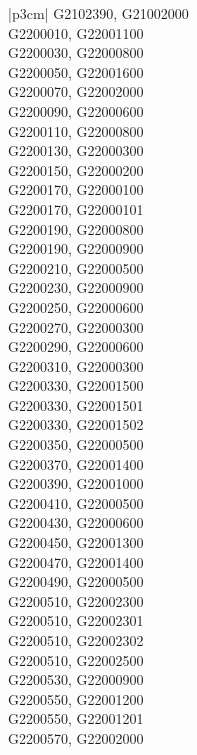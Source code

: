 \begin{customLongTable}{ |p{3cm}| }
G2102390, G21002000 \\ \hline
G2200010, G22001100 \\ \hline
G2200030, G22000800 \\ \hline
G2200050, G22001600 \\ \hline
G2200070, G22002000 \\ \hline
G2200090, G22000600 \\ \hline
G2200110, G22000800 \\ \hline
G2200130, G22000300 \\ \hline
G2200150, G22000200 \\ \hline
G2200170, G22000100 \\ \hline
G2200170, G22000101 \\ \hline
G2200190, G22000800 \\ \hline
G2200190, G22000900 \\ \hline
G2200210, G22000500 \\ \hline
G2200230, G22000900 \\ \hline
G2200250, G22000600 \\ \hline
G2200270, G22000300 \\ \hline
G2200290, G22000600 \\ \hline
G2200310, G22000300 \\ \hline
G2200330, G22001500 \\ \hline
G2200330, G22001501 \\ \hline
G2200330, G22001502 \\ \hline
G2200350, G22000500 \\ \hline
G2200370, G22001400 \\ \hline
G2200390, G22001000 \\ \hline
G2200410, G22000500 \\ \hline
G2200430, G22000600 \\ \hline
G2200450, G22001300 \\ \hline
G2200470, G22001400 \\ \hline
G2200490, G22000500 \\ \hline
G2200510, G22002300 \\ \hline
G2200510, G22002301 \\ \hline
G2200510, G22002302 \\ \hline
G2200510, G22002500 \\ \hline
G2200530, G22000900 \\ \hline
G2200550, G22001200 \\ \hline
G2200550, G22001201 \\ \hline
G2200570, G22002000 \\ \hline

\end{customLongTable}
